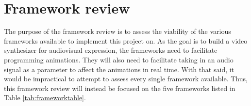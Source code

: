 \documentclass[../initial_thesis.tex]{subfiles}
\begin{document}
\section{Framework review}\label{sec:frameworkreview}
The purpose of the framework review is to assess the viability of the various frameworks available to implement this project on. As the goal is to build a video synthesizer for audiovisual expression, the frameworks need to facilitate programming animations. They will also need to facilitate taking in an audio signal as a parameter to affect the animations in real time. With that said, it would be impractical to attempt to assess every single framework available. Thus, this framework review will instead be focused on the five frameworks listed in Table \ref{tab:frameworktable}.

\begin{table}
\footnotesize
\centering
{}
\end{table}
\end{document}
